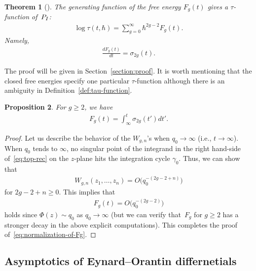 \documentclass[11pt]{article}
\newtheorem{thm}{Theorem}[section]
\newtheorem{prop}[thm]{Proposition}
\theoremstyle{definition}
\numberwithin{equation}{section}
\def\PI{P_{\rm I}}
\begin{document}
\begin{thm} [] \label{conj:1}
The generating function of the free energy $F_{g}(t)$
gives a $\tau$-function of~$\PI$:
\begin{gather*}
\log\tau(t,\hbar) = \sum_{g=0}^{\infty} \hbar^{2g-2} F_{g}(t).
\end{gather*}
Namely,
\begin{gather} \label{eq:tau-conjecture-g}
\frac{dF_{g}(t)}{dt} = \sigma_{2g}(t).
\end{gather}
\end{thm}

The proof will be given in Section~\ref{section:proof}.
It is worth mentioning that the closed free energies specify one
particular $\tau$-function although there is an ambiguity
in Def\/inition~\ref{def:tau-function}.

\begin{prop}
For $g \ge 2$, we have
\begin{gather} \label{eq:normalization-of-Fg}
F_{g}(t) = \int^{t}_{\infty} \sigma_{2g}(t')dt'.
\end{gather}
\end{prop}

\begin{proof}
Let us describe the behavior of the  $W_{g,n}$'s when
$q_{0} \rightarrow \infty$ (i.e., $t \rightarrow \infty$).
When $q_{0}$ tends to $\infty$,
no singular point of the integrand in the right hand-side of~\eqref{eq:top-rec}
on the $z$-plane hits the integration cycle $\gamma_{0}$.
Thus, we can show that
\begin{gather*}
W_{g,n}(z_{1},\dots,z_{n}) = O\big(q_{0}^{-(2g-2+n)}\big)
\end{gather*}
for $2g-2+n \ge 0$. This implies that
\begin{gather*}
F_{g}(t) = O\big(q_{0}^{-(2g-2)}\big)
\end{gather*}
holds since $\Phi(z) \sim q_{0}$ as $q_{0} \rightarrow \infty$
(but we can verify that~$F_{g}$ for $g \ge 2$
has a stronger decay in the above explicit computations).
This completes the proof of~\eqref{eq:normalization-of-Fg}.
\end{proof}


\subsection{Asymptotics of Eynard--Orantin dif\/fernetials}
\label{section:asymptotics-Wgn}
\end{document}

